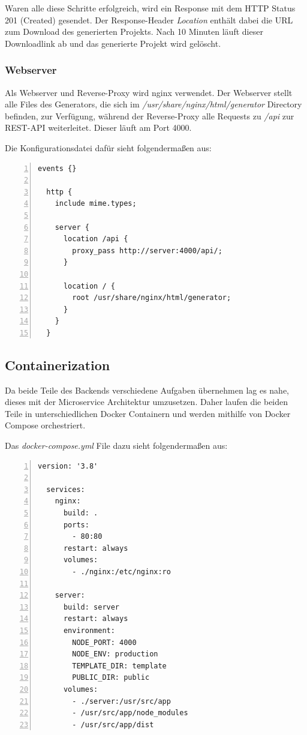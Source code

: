 Waren alle diese Schritte erfolgreich, wird ein Response mit dem HTTP Status 201 (Created)
gesendet.
Der Response-Header \textit{Location} enthält dabei die URL zum Download des generierten Projekts.
Nach 10 Minuten läuft dieser Downloadlink ab und das generierte Projekt wird gelöscht.

\subsubsection{Webserver}
Als Webserver und Reverse-Proxy wird nginx verwendet.
Der Webserver stellt alle Files des Generators, die sich im \textit{/usr/share/nginx/html/generator} Directory
befinden, zur Verfügung, während der Reverse-Proxy alle Requests zu \textit{/api} zur REST-API weiterleitet.
Dieser läuft am Port 4000.

Die Konfigurationsdatei dafür sieht folgendermaßen aus:

\begin{lstlisting}[numbers=left]
  events {}

  http {
    include mime.types;

    server {
      location /api {
        proxy_pass http://server:4000/api/;
      }

      location / {
        root /usr/share/nginx/html/generator;
      }
    }
  }
\end{lstlisting}

\subsection{Containerization}
Da beide Teile des Backends verschiedene Aufgaben übernehmen lag es nahe, dieses mit der Microservice
Architektur umzusetzen.
Daher laufen die beiden Teile in unterschiedlichen Docker Containern und werden mithilfe
von Docker Compose orchestriert.


Das \textit{docker-compose.yml} File dazu sieht folgendermaßen aus:

\begin{lstlisting}[numbers=left]
  version: '3.8'

  services:
    nginx:
      build: .
      ports:
        - 80:80
      restart: always
      volumes:
        - ./nginx:/etc/nginx:ro

    server:
      build: server
      restart: always
      environment:
        NODE_PORT: 4000
        NODE_ENV: production
        TEMPLATE_DIR: template
        PUBLIC_DIR: public
      volumes:
        - ./server:/usr/src/app
        - /usr/src/app/node_modules
        - /usr/src/app/dist
\end{lstlisting}

